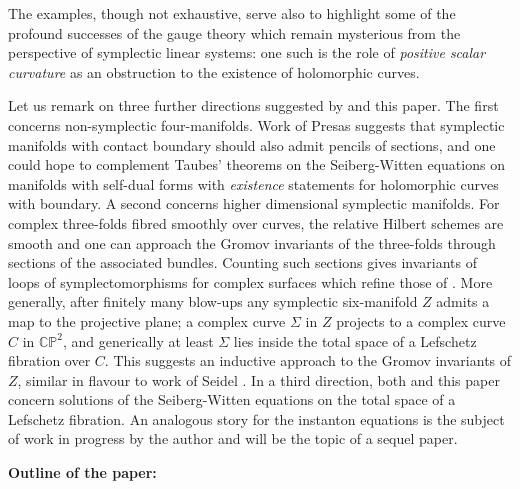 \documentclass[10pt]{article}
\newcommand{\pp}{\mathbb{P}}
\newcommand{\cc}{\mathbb{C}}
\begin{document}
\noindent  The examples, though not exhaustive, serve also to
highlight some of the 
profound successes of the gauge theory which remain mysterious from
the perspective of symplectic linear systems:  one such is the role of
\emph{positive scalar curvature} as an obstruction to the existence of
holomorphic curves. 

\vspace{0.2cm}

\noindent Let us remark on three further directions suggested by
\cite{SKDIS} and this paper.  The first concerns non-symplectic
four-manifolds.  Work of Presas \cite{Presas} suggests that symplectic
manifolds with contact boundary should also admit pencils of sections, and
one could hope to complement Taubes' theorems on the Seiberg-Witten
equations on manifolds with 
self-dual forms \cite{Taubes:selfdual} with \emph{existence} statements for
holomorphic curves with boundary.  A second concerns higher dimensional
symplectic manifolds.  For complex three-folds fibred smoothly over
curves, the relative Hilbert schemes are smooth and one can approach
the Gromov invariants of the three-folds through sections of the
associated bundles.  Counting such sections gives invariants of loops
of symplectomorphisms for complex surfaces which refine those of
\cite{Seidel2}.  More
generally, after finitely many blow-ups any symplectic  six-manifold $Z$
admits a map to the projective plane;
a complex curve $\Sigma$ in $Z$ projects to a complex curve $C$ in
$\cc \pp^2$, and 
generically at least $\Sigma$ lies inside the total space of a Lefschetz
fibration over $C$.  This suggests an inductive approach to the Gromov
invariants of $Z$, similar in flavour to work of Seidel
\cite{SeidelVM}.  In a third direction, both \cite{SKDIS} and this paper
concern solutions of the Seiberg-Witten equations on the total space
of a Lefschetz fibration.  An analogous story for the instanton
equations is the subject of work in progress by the author and will be
the topic of a sequel paper.

\vspace{0.2cm}

\noindent \textbf{Outline of the paper:}
\end{document}
